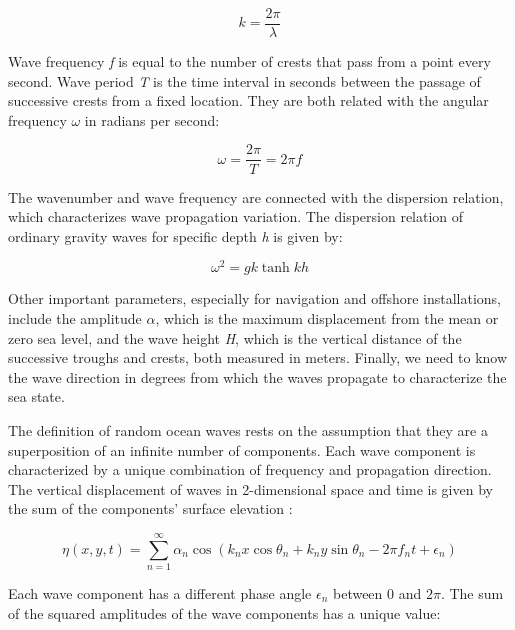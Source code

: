 \begin{equation}
k = \frac{2\pi}{\lambda}
\label{eqn:wavenumber}
\end{equation}


Wave frequency \emph{f} is equal to the number of crests that pass from a point every second. Wave period \emph{T} is the time interval in seconds between the passage of successive crests from a fixed location. They are both related with the angular frequency \emph{$\omega$} in radians per second:


\begin{equation}
\omega = \frac{2\pi}{T} = 2\pi f
\label{eqn:angular_frequency}
\end{equation}

The wavenumber and wave frequency are connected with the dispersion relation, which characterizes wave propagation variation. The dispersion relation of ordinary gravity waves for specific depth \emph{h} is given by: 

\begin{equation}
\omega^{2} = gk\tanh{kh} 
\label{eqn:dispersion_relation}
\end{equation}

Other important parameters, especially for navigation and offshore installations, include the amplitude $\alpha$, which is the maximum displacement from the mean or zero sea level, and the wave height \emph{H}, which is the vertical distance of the successive troughs and crests, both measured in meters. Finally, we need to know the wave direction in degrees from which the waves propagate to characterize the sea state.

 
The definition of random ocean waves rests on the assumption that they are a superposition of an infinite number of components. Each wave component is characterized by a unique combination of frequency and propagation direction. The vertical displacement of waves in 2-dimensional space and time is given by the sum of the components' surface elevation \cite{Goda2010a}:
 
 \begin{equation}
\eta \left(x, y, t\right) = \sum_{n=1}^{\infty} \alpha_{n} \cos{\left(k_{n}x \cos{\theta_{n}} + k_{n}y \sin{\theta_{n}} - 2\pi f_{n}t + \epsilon_{n}  \right)}
\label{eqn:wave_elevation_3d}
\end{equation}
 
 Each wave component has a different phase angle \emph{$\epsilon_{n}$} between 0 and $2\pi$. The sum of the squared amplitudes of the wave components has a unique value:
 
